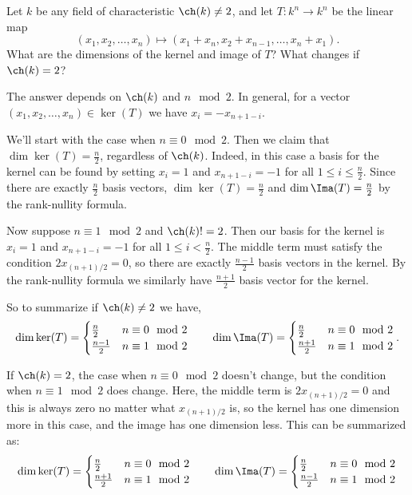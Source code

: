 \begin{problem}
  Let $k$ be any field of characteristic $\ch(k) \neq 2$, and let $T : k^n \to k^n$ be the linear map
\[ (x_1, x_2, \dots, x_n) \mapsto (x_1+x_n, x_2+x_{n-1}, \dots, x_n+x_1). \]What are the dimensions of the kernel and image of $T$? What changes if $\ch(k) = 2$?
\end{problem}

The answer depends on $\ch(k)$ and $n\mod 2$. In general, for a vector $(x_1,x_2,\ldots ,x_n)\in\ker(T)$ we have $x_i=-x_{n+1-i}$.

We'll start with the case when $n\equiv 0\mod 2$. Then we claim that $\dim \ker(T) = \frac{n}{2}$, regardless of $\ch(k)$. Indeed, in this case a basis for the kernel can be found by setting $x_i=1$ and $x_{n+1-i}=-1$ for all $1\leq i\leq \frac{n}{2}$. Since there are exactly $\frac{n}{2}$ basis vectors, $\dim \ker (T)=\frac{n}{2}$ and $\dim \Ima(T)=\frac{n}{2}$ by the rank-nullity formula.      

Now suppose $n\equiv 1\mod 2$ and $\ch(k)!=2$. Then our basis for the kernel is $x_i=1$ and $x_{n+1-i}=-1$ for all $1\leq i < \frac{n}{2}$. The middle term must satisfy the condition $2x_{(n+1) /2}=0$, so there are exactly $\frac{n-1}{2}$ basis vectors in the kernel. By the rank-nullity formula we similarly have $\frac{n+1}{2}$ basis vector for the kernel.

So to summarize if $\ch(k)\neq 2$ we have,
\[
  \dim \ker(T)=\begin{cases}
    \frac{n}{2}&n\equiv 0\mod 2\\
    \frac{n-1}{2}& n\equiv 1\mod 2
  \end{cases}\quad\quad
  \dim \Ima(T)=\begin{cases}
    \frac{n}{2}&n\equiv 0\mod 2\\
    \frac{n+1}{2}& n\equiv 1\mod 2
  \end{cases}
.\] 

If $\ch(k)=2$, the case when $n\equiv 0 \mod 2$ doesn't change, but the condition when $n\equiv 1\mod 2$ does change. Here, the middle term is $2x_{(n+1) /2}=0$ and this is always zero no matter what $x_{(n+1) /2}$ is, so the kernel has one dimension more in this case, and the image has one dimension less. This can be summarized as:
\[
  \dim \ker(T)=\begin{cases}
  \frac{n}{2}&n\equiv 0\mod 2\\
  \frac{n+1}{2}& n\equiv 1\mod 2
\end{cases}\quad\quad
\dim \Ima(T)=\begin{cases}
  \frac{n}{2}&n\equiv 0\mod 2\\
  \frac{n-1}{2}& n\equiv 1\mod 2
\end{cases}
\] 